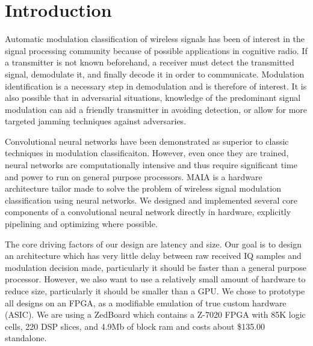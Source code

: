 \section{Introduction}
Automatic modulation classification of wireless signals has been of interest in the signal processing community because of possible applications in cognitive radio.  If a transmitter is not known beforehand, a receiver must detect the transmitted signal, demodulate it, and finally decode it in order to communicate.  Modulation identification is a necessary step in demodulation and is therefore of interest.  It is also possible that in adversarial situations, knowledge of the predominant signal modulation can aid a friendly transmitter in avoiding detection, or allow for more targeted jamming techniques against adversaries.

Convolutional neural networks have been demonstrated as superior to classic techniques in modulation classificaiton.  However, even once they are trained, neural networks are computationally intensive and thus require significant time and power to run on general purpose processors.  MAIA is a hardware architecture tailor made to solve the problem of wireless signal modulation classification using neural networks.  We designed and implemented several core components of a convolutional neural network directly in hardware, explicitly pipelining and optimizing where possible.

The core driving factors of our design are latency and size.  Our goal is to design an architecture which has very little delay between raw received IQ samples and modulation decision made, particularly it should be faster than a general purpose processor.  However, we also want to use a relatively small amount of hardware to reduce size, particularly it should be smaller than a GPU.  We chose to prototype all designs on an FPGA, as a modifiable emulation of true custom hardware (ASIC).  We are using a ZedBoard which contains a Z-7020 FPGA with 85K logic cells, 220 DSP slices, and 4.9Mb of block ram and costs about \$135.00 standalone.
